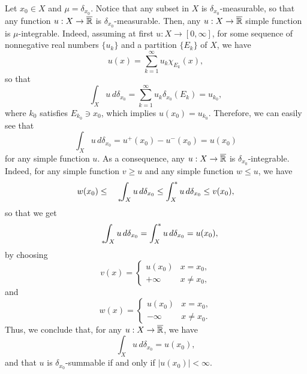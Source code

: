 \begin{example}
Let $x_{0} \in X$ and $\mu = \delta_{x_{0}}$. Notice that any subset in $X$ is $\delta_{x_{0}}$-measurable, so that any function $u: X \to \overline{\mathbb{R}}$ is $\delta_{x_{0}}$-measurable. Then, any $u : X \to \overline{\mathbb{R}}$ simple function is $\mu$-integrable. Indeed, assuming at first $u : X \to [0, \infty]$, for some sequence of nonnegative real numbers $\{u_{k}\}$ and a partition $\{E_{k}\}$ of $X$, we have
\begin{equation*}
u(x) = \sum_{k=1}^\infty u_k \chi_{E_k}(x),
\end{equation*}
so that
\begin{equation*}
\int_{X} u \, d \delta_{x_{0}} = \sum_{k = 1}^{\infty} u_{k} \delta_{x_{0}}(E_{k}) = u_{k_{0}},
\end{equation*}
where $k_{0}$ satisfies $E_{k_{0}} \ni x_{0}$, which implies $u(x_{0}) = u_{k_{0}}$. Therefore, we can easily see that
\begin{equation*}
\int_{X} u \, d \delta_{x_{0}} = u^{+}(x_{0}) - u^{-}(x_{0}) = u(x_{0})
\end{equation*}
for any simple function $u$. As a consequence, any $u : X \to \overline{\mathbb{R}}$ is $\delta_{x_{0}}$-integrable. Indeed, for any simple function $v \ge u$ and any simple function $w \le u$, we have
\begin{equation*}
w(x_{0}) \le {\phantom{\int}}_{*}\hspace{-0.3em}\int_{X} u \, d\delta_{x_{0}} \le \int^*_X u \, d\delta_{x_{0}} \le v(x_{0}),
\end{equation*} 
so that we get 
\begin{equation*}
{\phantom{\int}}_{*}\hspace{-0.3em}\int_{X} u \, d\delta_{x_{0}} = \int^*_X u \, d\delta_{x_{0}} = u(x_{0}),
\end{equation*}
by choosing 
\begin{equation*}
v(x) = \begin{cases} u(x_{0}) & x = x_{0}, \\
+ \infty & x \neq x_{0},
\end{cases}
\end{equation*}
and
\begin{equation*}
w(x) = \begin{cases} u(x_{0}) & x = x_{0}, \\
- \infty & x \neq x_{0}.
\end{cases}
\end{equation*}
Thus, we conclude that, for any $u: X \to \overline{\mathbb{R}}$, we have
\begin{equation*}
\int_{X} u \, d \delta_{x_{0}} = u(x_{0}),
\end{equation*}
and that $u$ is $\delta_{x_{0}}$-summable if and only if $|u(x_{0})| < \infty$. 
\end{example}

